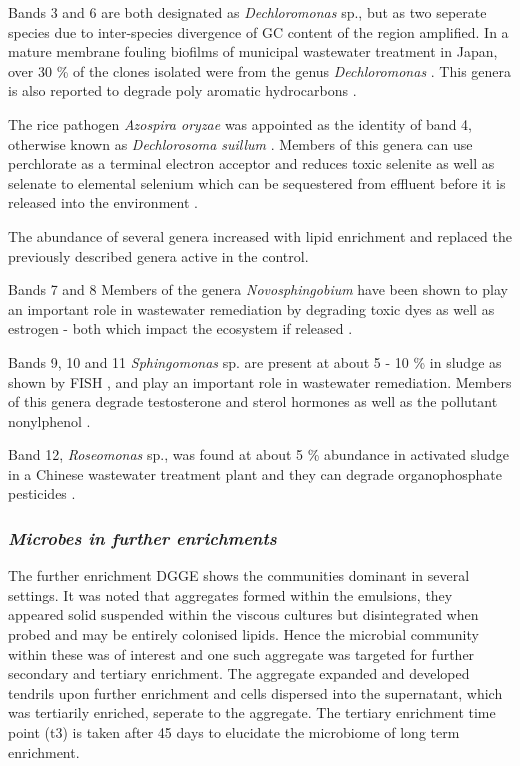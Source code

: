 \documentclass[11pt]{article}
\begin{document}
Bands 3 and 6 are both designated as \emph{Dechloromonas} sp., but as two seperate species due to inter-species divergence of GC content of the region amplified. In a mature membrane fouling biofilms of municipal wastewater treatment in Japan, over 30 \% of the clones isolated were from the genus \emph{Dechloromonas} \cite{miura2007membrane}. This genera is also reported to degrade poly aromatic hydrocarbons \cite{oshiki2008pha}.

The rice pathogen \emph{Azospira oryzae} was appointed as the identity of band 4, otherwise known as \emph{Dechlorosoma suillum} \cite{tan2003dechlorosoma}. Members of this genera can use perchlorate as a terminal electron acceptor and reduces toxic selenite as well as selenate to elemental selenium which can be sequestered from effluent before it is released into the environment \cite{reinhold2000reassessment,hunter2007azospira,wilhelmus2013microbiological}.


The abundance of several genera increased with lipid enrichment and replaced the previously described genera active in the control.

Bands 7 and 8 Members of the genera \emph{Novosphingobium} have been shown to play an important role in wastewater remediation by degrading toxic dyes as well as estrogen - both which impact the ecosystem if released \cite{addison2007novosphingobium,hashimoto2009contribution}.


Bands 9, 10 and 11 \emph{Sphingomonas} sp. are present at about 5 - 10 \% in sludge as shown by FISH \cite{neef1999detection}, and play an important role in wastewater remediation. Members of this genera degrade testosterone and sterol hormones as well as the pollutant nonylphenol \cite{fujii2001sphingomonas,roh201017beta}.


Band 12, \emph{Roseomonas} sp., was found at about 5 \% abundance in activated sludge in a Chinese wastewater treatment plant and they can degrade organophosphate pesticides \cite{jiang2008bacterial,jiang2006isolation}.

\subsubsection{\emph{Microbes in further enrichments}}
The further enrichment DGGE shows the communities dominant in several settings. It was noted that aggregates formed within the emulsions, they appeared solid suspended within the viscous cultures but disintegrated when probed and may be entirely colonised lipids. Hence the microbial community within these was of interest and one such aggregate was targeted for further secondary and tertiary enrichment. The aggregate expanded and developed tendrils upon further enrichment and    cells dispersed into the supernatant, which was tertiarily enriched, seperate to the aggregate. The tertiary enrichment time point (t3) is taken after 45 days to elucidate the microbiome of long term enrichment.
\end{document}
